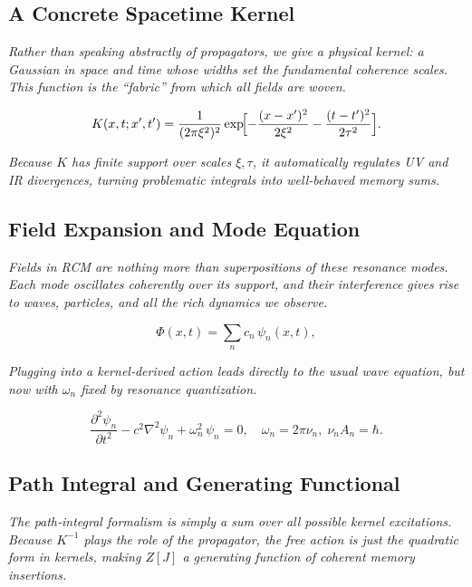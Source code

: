 \subsection{A Concrete Spacetime Kernel}

\textit{Rather than speaking abstractly of propagators, we give a physical kernel: a Gaussian in space and time whose widths set the fundamental coherence scales.  This function is the “fabric” from which all fields are woven.}

\begin{equation}\label{eq:spacetime_kernel}
K(x,t; x',t')
= \frac{1}{(2\pi\xi^2)^{2}}
  \exp\!\Bigl[-\frac{(x - x')^2}{2\xi^2}
               -\frac{(t - t')^2}{2\tau^2}\Bigr].
\end{equation}

\textit{Because $K$ has finite support over scales $\xi,\tau$, it automatically regulates UV and IR divergences, turning problematic integrals into well‐behaved memory sums.}

\subsection{Field Expansion and Mode Equation}

\textit{Fields in RCM are nothing more than superpositions of these resonance modes.  Each mode oscillates coherently over its support, and their interference gives rise to waves, particles, and all the rich dynamics we observe.}

\begin{equation}\label{eq:field_expansion}
\Phi(x,t)
= \sum_n c_n\,\psi_n(x,t),
\end{equation}

\textit{Plugging into a kernel‐derived action leads directly to the usual wave equation, but now with $\omega_n$ fixed by resonance quantization.}

\begin{equation}\label{eq:mode_wave_eq}
\frac{\partial^2\psi_n}{\partial t^2}
- c^2\nabla^2\psi_n + \omega_n^2\,\psi_n = 0,
\quad \omega_n=2\pi\nu_n,\;\nu_n A_n=\hbar.
\end{equation}

\subsection{Path Integral and Generating Functional}

\textit{The path‐integral formalism is simply a sum over all possible kernel excitations.  Because $K^{-1}$ plays the role of the propagator, the free action is just the quadratic form in kernels, making $Z[J]$ a generating function of coherent memory insertions.}

